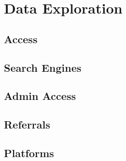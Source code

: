 %
%

\pagebreak
\section{Data Exploration}

\onehalfspacing

\subsection{Access}

\subsection{Search Engines}

\subsection{Admin Access}

\subsection{Referrals}

\subsection{Platforms}
